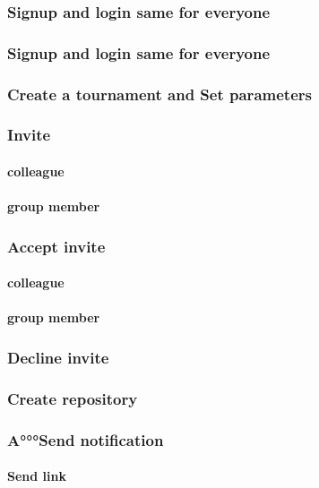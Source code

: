 \documentclass{article}
\begin{document}
            \subsubsection{Signup and login same for everyone}
            \subsubsection{Signup and login same for everyone}
            \subsubsection{Create a tournament and Set parameters}
            \subsubsection{Invite}
                \paragraph*{colleague}

                \paragraph*{group member}
            \subsubsection{Accept invite}
                \paragraph*{colleague}

                \paragraph*{group member}
            \subsubsection{Decline invite}
            \subsubsection{Create repository}
            \subsubsection{A°°°Send notification}
                \paragraph*{Send link}
\end{document}
